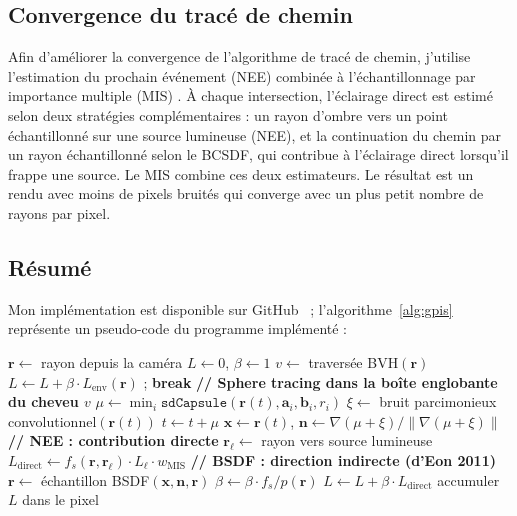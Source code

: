 \subsection{Convergence du tracé de chemin}

Afin d'améliorer la convergence de l'algorithme de tracé de chemin, j'utilise l'estimation du prochain événement (NEE) combinée à l'échantillonnage par importance multiple (MIS) \cite{veach1995mis,veach1997thesis}. À chaque intersection, l'éclairage direct est estimé selon deux stratégies complémentaires : un rayon d'ombre vers un point échantillonné sur une source lumineuse (NEE), et la continuation du chemin par un rayon échantillonné selon le BCSDF, qui contribue à l'éclairage direct lorsqu'il frappe une source. Le MIS combine ces deux estimateurs. Le résultat est un rendu avec moins de pixels bruités qui converge avec un plus petit nombre de rayons par pixel.

\subsection{Résumé}

Mon implémentation est disponible sur GitHub~\cite{felixg13gpis} ; l'algorithme~\ref{alg:gpis} représente un pseudo-code du programme implémenté :

\begin{algorithm}[H]
\caption{Rendu d'un cheveu par surface implicite par processus gaussien}
\label{alg:gpis}
\begin{algorithmic}[1]
        \State $\mathbf{r} \leftarrow$ rayon depuis la caméra
        \State $L \leftarrow 0$, $\beta \leftarrow 1$
            \State $v \leftarrow$ traversée BVH$(\mathbf{r})$ 
                \State $L \leftarrow L + \beta \cdot L_{\text{env}}(\mathbf{r})$ ; \textbf{break}
            \EndIf
            \State \textbf{// Sphere tracing dans la boîte englobante du cheveu $v$}
            \Repeat
                \State $\mu \leftarrow \min_i \texttt{sdCapsule}(\mathbf{r}(t), \mathbf{a}_i, \mathbf{b}_i, r_i)$ 
                \State $\xi \leftarrow$ bruit parcimonieux convolutionnel$(\mathbf{r}(t))$ 
                \State $t \leftarrow t + \mu$
            \State $\mathbf{x} \leftarrow \mathbf{r}(t)$, $\mathbf{n} \leftarrow \nabla(\mu + \xi) / \|\nabla(\mu + \xi)\|$
            \State \textbf{// NEE : contribution directe}
            \State $\mathbf{r}_{\ell} \leftarrow$ rayon vers source lumineuse
            \State $L_{\text{direct}} \leftarrow f_s(\mathbf{r}, \mathbf{r}_\ell) \cdot L_{\ell} \cdot w_{\text{MIS}}$
            \State \textbf{// BSDF : direction indirecte (d'Eon 2011)}
            \State $\mathbf{r} \leftarrow$ échantillon BSDF$(\mathbf{x}, \mathbf{n}, \mathbf{r})$
            \State $\beta \leftarrow \beta \cdot f_s / p(\mathbf{r})$
            \State $L \leftarrow L + \beta \cdot L_{\text{direct}}$
        \EndFor
        \State accumuler $L$ dans le pixel
    \EndFor
\EndFor
\end{algorithmic}
\end{algorithm}
